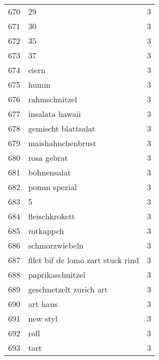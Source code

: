 \begin{tabular}{llr}
670  &                                                 29 &      3 \\
671  &                                                 30 &      3 \\
672  &                                                 35 &      3 \\
673  &                                                 37 &      3 \\
674  &                                              eiern &      3 \\
675  &                                               humm &      3 \\
676  &                                      rahmschnitzel &      3 \\
677  &                                    insalata hawaii &      3 \\
678  &                                gemischt blattsalat &      3 \\
679  &                                  maishahnchenbrust &      3 \\
680  &                                        rosa gebrat &      3 \\
681  &                                        bohnensalat &      3 \\
682  &                                       pomm spezial &      3 \\
683  &                                                  5 &      3 \\
684  &                                     fleischkrokett &      3 \\
685  &                                          rotkappch &      3 \\
686  &                                     schmorzwiebeln &      3 \\
687  &                  filet bif de lomo zart stuck rind &      3 \\
688  &                                   paprikaschnitzel &      3 \\
689  &                            geschnetzelt zurich art &      3 \\
690  &                                           art haus &      3 \\
691  &                                           new styl &      3 \\
692  &                                               roll &      3 \\
693  &                                               tart &      3 \\

\end{tabular}
